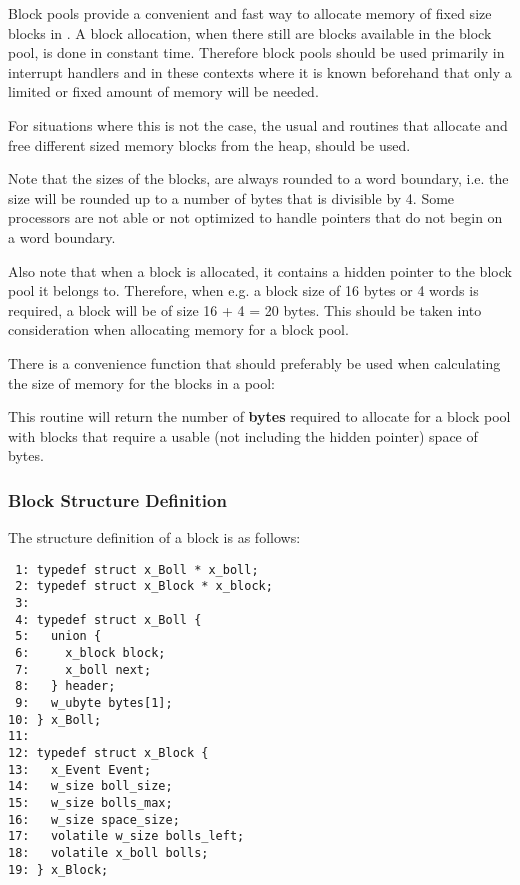 Block pools provide a convenient and fast way to allocate memory of fixed
size blocks in \oswald. A block allocation, when there still are blocks
available in the block pool, is done in constant time. Therefore block pools
should be used primarily in interrupt handlers and in these contexts where
it is known beforehand that only a limited or fixed amount of memory will be needed. 

For situations where this is not the case, the usual 
and  routines that allocate and free different sized
memory blocks from the heap, should be used.

Note that the sizes of the blocks, are always rounded to a word boundary,
i.e. the size will be rounded up to a number of bytes that is divisible by 4.
Some processors are not able or not optimized to handle pointers that do not
begin on a word boundary.

Also note that when a block is allocated, it contains a hidden pointer to
the block pool it belongs to. Therefore, when e.g. a block size of 16 bytes
or 4 words is required, a block will be of size 16 + 4 = 20 bytes. This
should be taken into consideration when allocating memory for a block pool.

There is a convenience function that should preferably be used when
calculating the size of memory for the blocks in a pool:


This routine will return the number of \textbf{bytes} required to allocate
for a block pool with  blocks that require a usable (not
including the hidden pointer) space of  bytes.

\subsubsection{Block Structure Definition}

The structure definition of a block is as follows:

\bcode
\begin{verbatim}
 1: typedef struct x_Boll * x_boll;
 2: typedef struct x_Block * x_block;
 3:
 4: typedef struct x_Boll {
 5:   union {
 6:     x_block block;
 7:     x_boll next;
 8:   } header;
 9:   w_ubyte bytes[1];
10: } x_Boll;
11:
12: typedef struct x_Block {
13:   x_Event Event;
14:   w_size boll_size;
15:   w_size bolls_max;
16:   w_size space_size;
17:   volatile w_size bolls_left;
18:   volatile x_boll bolls;
19: } x_Block;
\end{verbatim}
\ecode

